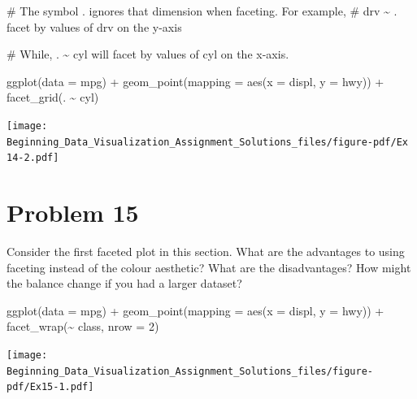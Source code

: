 \documentclass[
  letterpaper,
  DIV=11,
  numbers=noendperiod]{scrreprt}
\newenvironment{Shaded}{\begin{snugshade}}{\end{snugshade}}
\newcommand{\AttributeTok}[1]{\textcolor[rgb]{0.40,0.45,0.13}{#1}}
\newcommand{\CommentTok}[1]{\textcolor[rgb]{0.37,0.37,0.37}{#1}}
\newcommand{\DecValTok}[1]{\textcolor[rgb]{0.68,0.00,0.00}{#1}}
\newcommand{\FunctionTok}[1]{\textcolor[rgb]{0.28,0.35,0.67}{#1}}
\newcommand{\NormalTok}[1]{\textcolor[rgb]{0.00,0.23,0.31}{#1}}
\newcommand{\SpecialCharTok}[1]{\textcolor[rgb]{0.37,0.37,0.37}{#1}}
\begin{document}
\begin{Shaded}
\begin{Highlighting}[]
\CommentTok{\# The symbol . ignores that dimension when faceting. For example, }
\CommentTok{\# drv \textasciitilde{} . facet by values of drv on the y{-}axis}

\CommentTok{\# While, . \textasciitilde{} cyl will facet by values of cyl on the x{-}axis.}

\FunctionTok{ggplot}\NormalTok{(}\AttributeTok{data =}\NormalTok{ mpg) }\SpecialCharTok{+} 
  \FunctionTok{geom\_point}\NormalTok{(}\AttributeTok{mapping =} \FunctionTok{aes}\NormalTok{(}\AttributeTok{x =}\NormalTok{ displ, }\AttributeTok{y =}\NormalTok{ hwy)) }\SpecialCharTok{+}
  \FunctionTok{facet\_grid}\NormalTok{(. }\SpecialCharTok{\textasciitilde{}}\NormalTok{ cyl)}
\end{Highlighting}
\end{Shaded}

\texttt{[image: Beginning\_Data\_Visualization\_Assignment\_Solutions\_files/figure-pdf/Ex 14-2.pdf]}

\section*{Problem 15}\label{problem-15-3}


Consider the first faceted plot in this section. What are the advantages
to using faceting instead of the colour aesthetic? What are the
disadvantages? How might the balance change if you had a larger dataset?

\begin{Shaded}
\begin{Highlighting}[]
\FunctionTok{ggplot}\NormalTok{(}\AttributeTok{data =}\NormalTok{ mpg) }\SpecialCharTok{+} 
  \FunctionTok{geom\_point}\NormalTok{(}\AttributeTok{mapping =} \FunctionTok{aes}\NormalTok{(}\AttributeTok{x =}\NormalTok{ displ, }\AttributeTok{y =}\NormalTok{ hwy)) }\SpecialCharTok{+} 
  \FunctionTok{facet\_wrap}\NormalTok{(}\SpecialCharTok{\textasciitilde{}}\NormalTok{ class, }\AttributeTok{nrow =} \DecValTok{2}\NormalTok{)}
\end{Highlighting}
\end{Shaded}

\texttt{[image: Beginning\_Data\_Visualization\_Assignment\_Solutions\_files/figure-pdf/Ex15-1.pdf]}
\end{document}
